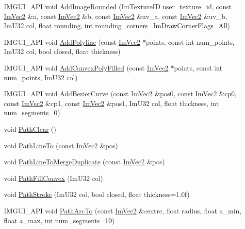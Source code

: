 \begin{DoxyCompactItemize}
\item 
I\+M\+G\+U\+I\+\_\+\+A\+PI void \hyperlink{struct_im_draw_list_a1418616a4350bad80b4c751cd8efac30}{Add\+Image\+Rounded} (Im\+Texture\+ID user\+\_\+texture\+\_\+id, const \hyperlink{struct_im_vec2}{Im\+Vec2} \&a, const \hyperlink{struct_im_vec2}{Im\+Vec2} \&b, const \hyperlink{struct_im_vec2}{Im\+Vec2} \&uv\+\_\+a, const \hyperlink{struct_im_vec2}{Im\+Vec2} \&uv\+\_\+b, Im\+U32 col, float rounding, int rounding\+\_\+corners=Im\+Draw\+Corner\+Flags\+\_\+\+All)
\item 
I\+M\+G\+U\+I\+\_\+\+A\+PI void \hyperlink{struct_im_draw_list_aad1fcecdd4602fe6bb253fdee8ad5378}{Add\+Polyline} (const \hyperlink{struct_im_vec2}{Im\+Vec2} $\ast$points, const int num\+\_\+points, Im\+U32 col, bool closed, float thickness)
\item 
I\+M\+G\+U\+I\+\_\+\+A\+PI void \hyperlink{struct_im_draw_list_a9817e2a41cffdd2ff810a715bdb0eba9}{Add\+Convex\+Poly\+Filled} (const \hyperlink{struct_im_vec2}{Im\+Vec2} $\ast$points, const int num\+\_\+points, Im\+U32 col)
\item 
I\+M\+G\+U\+I\+\_\+\+A\+PI void \hyperlink{struct_im_draw_list_afd2eeeb8ed23b6222513953b03620101}{Add\+Bezier\+Curve} (const \hyperlink{struct_im_vec2}{Im\+Vec2} \&pos0, const \hyperlink{struct_im_vec2}{Im\+Vec2} \&cp0, const \hyperlink{struct_im_vec2}{Im\+Vec2} \&cp1, const \hyperlink{struct_im_vec2}{Im\+Vec2} \&pos1, Im\+U32 col, float thickness, int num\+\_\+segments=0)
\item 
void \hyperlink{struct_im_draw_list_ae9ad5f4d638b1bfd9383618dc60e3f18}{Path\+Clear} ()
\item 
void \hyperlink{struct_im_draw_list_a828d944325ed58d8b57abd3647bffaaf}{Path\+Line\+To} (const \hyperlink{struct_im_vec2}{Im\+Vec2} \&pos)
\item 
void \hyperlink{struct_im_draw_list_aa3dd11945fb62495f8b9e1392ed724e3}{Path\+Line\+To\+Merge\+Duplicate} (const \hyperlink{struct_im_vec2}{Im\+Vec2} \&pos)
\item 
void \hyperlink{struct_im_draw_list_aea9301cb99ebf4b27f5d3959017567c9}{Path\+Fill\+Convex} (Im\+U32 col)
\item 
void \hyperlink{struct_im_draw_list_ac3172e376a4b77915bb22b6d8092b8b2}{Path\+Stroke} (Im\+U32 col, bool closed, float thickness=1.\+0f)
\item 
I\+M\+G\+U\+I\+\_\+\+A\+PI void \hyperlink{struct_im_draw_list_acb69ef7febcc54c9e5e09d2460c85b61}{Path\+Arc\+To} (const \hyperlink{struct_im_vec2}{Im\+Vec2} \&centre, float radius, float a\+\_\+min, float a\+\_\+max, int num\+\_\+segments=10)

\end{DoxyCompactItemize}
